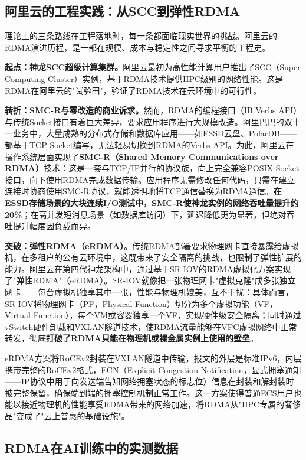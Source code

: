 \subsection{阿里云的工程实践：从SCC到弹性RDMA}

理论上的三条路线在工程落地时，每一条都面临现实世界的挑战。阿里云的RDMA演进历程，是一部在规模、成本与稳定性之间寻求平衡的工程史。

\textbf{起点：神龙SCC超级计算集群。}阿里云最初为高性能计算用户推出了SCC（Super Computing Cluster）实例，基于RDMA技术提供HPC级别的网络性能。这是RDMA在阿里云的"试验田"，验证了RDMA技术在云环境中的可行性。

\textbf{转折：SMC-R与零改造的商业诉求。}然而，RDMA的编程接口（IB Verbs API）与传统Socket接口有着巨大差异，要求应用程序进行大规模改造。阿里巴巴的双十一业务中，大量成熟的分布式存储和数据库应用——如ESSD云盘、PolarDB——都基于TCP Socket编写，无法轻易切换到RDMA的Verbs API。为此，阿里云在操作系统层面实现了\textbf{SMC-R（Shared Memory Communications over RDMA）}技术：这是一套与TCP/IP并行的协议族，向上完全兼容POSIX Socket接口，向下使用RDMA完成数据传输。应用程序无需修改任何代码，只需在建立连接时协商使用SMC-R协议，就能透明地将TCP通信替换为RDMA通信。\textbf{在ESSD存储场景的大块连续I/O测试中，SMC-R使神龙实例的网络吞吐量提升约20\%}；在高并发短消息场景（如数据库访问）下，延迟降低更为显著，但绝对吞吐提升幅度因负载而异。

\textbf{突破：弹性RDMA（eRDMA）}。传统RDMA部署要求物理网卡直接暴露给虚拟机，在多租户的公有云环境中，这既带来了安全隔离的挑战，也限制了弹性扩展的能力。阿里云在第四代神龙架构中，通过基于SR-IOV的RDMA虚拟化方案实现了"弹性RDMA"（eRDMA）。SR-IOV就像把一张物理网卡"虚拟克隆"成多张独立网卡——每台虚拟机独享其中一张，性能与物理机媲美，互不干扰：具体而言，SR-IOV将物理网卡（PF，Physical Function）切分为多个虚拟功能（VF，Virtual Function），每个VM或容器独享一个VF，实现硬件级安全隔离；同时通过vSwitch硬件卸载和VXLAN隧道技术，使RDMA流量能够在VPC虚拟网络中正常转发，彻底\textbf{打破了RDMA只能在物理机或裸金属实例上使用的壁垒}。

eRDMA方案将RoCEv2封装在VXLAN隧道中传输，报文的外层是标准IPv6，内层携带完整的RoCEv2格式，ECN（Explicit Congestion Notification，显式拥塞通知——IP协议中用于向发送端告知网络拥塞状态的标志位）信息在封装和解封装时被完整保留，确保端到端的拥塞控制机制正常工作。这一方案使得普通ECS用户也能以接近物理机的性能享受RDMA带来的网络加速，将RDMA从"HPC专属的奢侈品"变成了"云上普惠的基础设施"。

\subsection{RDMA在AI训练中的实测数据}

